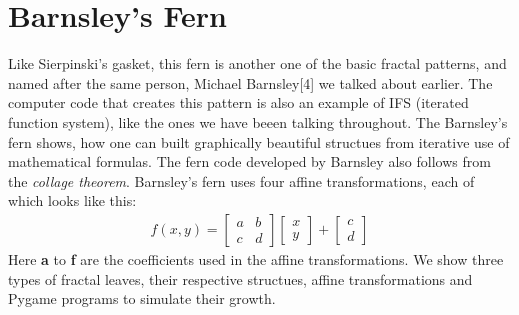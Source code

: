 \documentclass{article}
\begin{document}
\section{Barnsley's Fern}
Like Sierpinski's gasket, this fern is another one of the basic fractal patterns, and named after the same person, Michael Barnsley[4] we talked about earlier. The computer code that creates this pattern is also an example of IFS (iterated function system), like the ones we have beeen talking throughout. The Barnsley's fern shows, how one can built graphically beautiful structues from iterative use of mathematical formulas. The fern code developed by Barnsley also follows from the \textit{collage theorem}. Barnsley's fern uses four affine transformations, each of which looks like this:
\begin{gather}
f(x, y)=\begin{bmatrix}a & b \\ c & d \end{bmatrix}\begin{bmatrix}x\\y\end{bmatrix}+\begin{bmatrix}c\\d\end{bmatrix}
\end{gather}
Here \textbf{a} to \textbf{f} are the coefficients used in the affine transformations. We show three types of fractal leaves, their respective structues, affine transformations and Pygame programs to simulate their growth.
\end{document}
